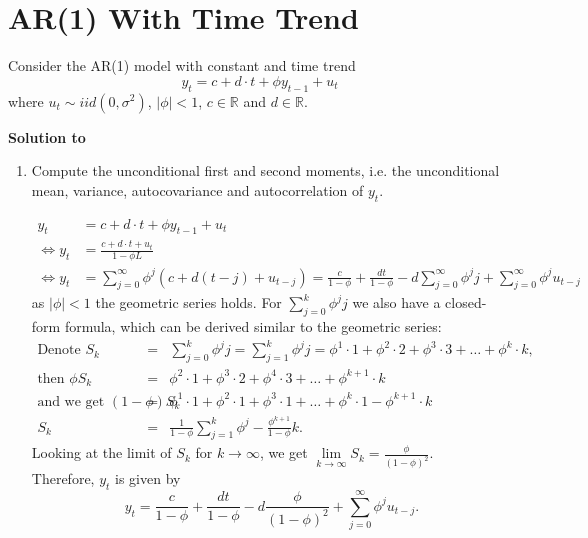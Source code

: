 \documentclass[a4paper]{scrartcl}
\begin{document}
\section[AR(1) With Time Trend]{AR(1) With Time Trend}\label{ex:AR1timetrend}
Consider the AR(1) model with constant and time trend
$$ y_t = c + d\cdot t + \phi y_{t-1} + u_t$$
where $u_t \sim iid(0,\sigma^2)$, $|\phi|<1$, $c \in \mathbb{R}$ and $d \in \mathbb{R}$.
\begin{solution}\textbf{Solution to }\end{solution}
\begin{enumerate}
	\item Compute the unconditional first and second moments, i.e. the unconditional mean, variance, autocovariance and autocorrelation of $y_t$.
	\begin{solution}		
		\begin{align*}
			y_t &= c + d\cdot t + \phi y_{t-1} + u_t\\
			\Leftrightarrow y_t &= \frac{c + d\cdot t + u_t}{1-\phi L}\\
			\Leftrightarrow y_t &= \sum_{j=0}^{\infty}\phi^j(c+d(t-j)+u_{t-j}) = \frac{c}{1-\phi} + \frac{dt}{1-\phi} - d\sum_{j=0}^{\infty}\phi^j j + \sum_{j=0}^{\infty}\phi^j u_{t-j}
		\end{align*}
		as $|\phi| <1$ the geometric series holds. For $\sum_{j=0}^{k} \phi^j j$ we also have a closed-form formula, which can be derived similar to the geometric series:
		\begin{eqnarray*}
			\text{Denote } S_{k}  
			&=&	\sum_{j=0}^{k} \phi^j j = \sum_{j=1}^{k} \phi^j j
			=	\phi^1 \cdot 1 + \phi^2 \cdot 2+ \phi^3 \cdot 3 + \dots +  	
			\phi^k \cdot k, \\
			\text{then } \phi S_{k} 
			&=& \phi^2 \cdot 1 + \phi^3 \cdot 2+ \phi^4 \cdot 3 + \dots +  	
			\phi^{k+1} \cdot k \\
			\text{and we get } (1 - \phi) S_{k}
			&=& \phi^1 \cdot 1+ \phi^2 \cdot 1 + \phi^3 \cdot 1 + \dots + \phi^{k} \cdot 1 - \phi^{k+1} \cdot k \\
			S_{k}	&=& \frac{1}{1 - \phi} \sum_{j = 1}^{k} \phi^j - \frac{\phi^{k+1}}{1 - \phi} k.
		\end{eqnarray*} 
		Looking at the limit of $S_{k}$ for $k \to \infty$, we get
		$\lim\limits_{k \to \infty} S_{k} = \frac{\phi}{(1 - \phi)^2}$. \\
		Therefore, $y_{t}$ is given by
		\begin{displaymath}
		y_{t} = \frac{c}{1-\phi} + \frac{dt}{1-\phi} - d \frac{\phi}{(1 - \phi)^2}  + \sum_{j=0}^{\infty} \phi^j u_{t-j}.
		\end{displaymath} 
		

\end{solution}
\end{enumerate}
\end{document}
